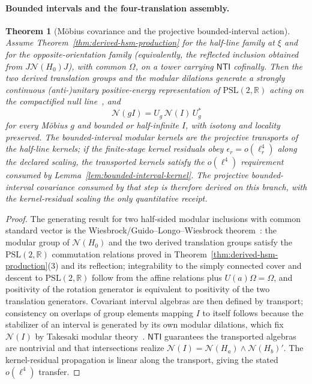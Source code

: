 \documentclass[11pt]{article}
\newtheorem{theorem}{Theorem}[section]
\begin{document}
\paragraph{Bounded intervals and the four-translation assembly.}

\begin{theorem}[M\"obius covariance and the projective bounded-interval action]
\label{thm:mobius-bounded-intervals}
Assume Theorem~\ref{thm:derived-hsm-production} for the half-line family at
\(\xi\) and for the opposite-orientation family (equivalently, the reflected
inclusion obtained from \(J\mathcal N(H_0)J\)), with common \(\Omega\), on a
tower carrying \(\mathsf{NTI}\) cofinally. Then the two derived translation
groups and the modular dilations generate a strongly continuous (anti-)unitary
positive-energy representation of \(\mathrm{PSL}(2,\mathbb R)\) acting on the
compactified null line~\cite{wiesbrock93,glw98}, and
\[
\mathcal N(gI)=U_g\,\mathcal N(I)\,U_g^{*}
\]
for every M\"obius \(g\) and bounded or half-infinite \(I\), with isotony and
locality preserved. The bounded-interval modular kernels are the projective
transports of the half-line kernels; if the finite-stage kernel residuals obey
\(\epsilon_r=o(\ell_r^4)\) along the declared scaling, the transported kernels
satisfy the \(o(\ell^4)\) requirement consumed by
Lemma~\ref{lem:bounded-interval-kernel}. The projective bounded-interval
covariance consumed by that step is therefore derived on this branch, with the
kernel-residual scaling the only quantitative receipt.
\end{theorem}

\begin{proof}
The generating result for two half-sided modular inclusions with common
standard vector is the Wiesbrock/Guido--Longo--Wiesbrock
theorem~\cite{wiesbrock93,glw98}: the modular group of
\(\mathcal N(H_0)\) and the two derived translation groups satisfy the
\(\mathrm{PSL}(2,\mathbb R)\) commutation relations proved in
Theorem~\ref{thm:derived-hsm-production}(3) and its reflection; integrability
to the simply connected cover and descent to \(\mathrm{PSL}(2,\mathbb R)\)
follow from the affine relations plus \(U(a)\Omega=\Omega\), and positivity of
the rotation generator is equivalent to positivity of the two translation
generators. Covariant interval algebras are then defined by transport;
consistency on overlaps of group elements mapping \(I\) to itself follows
because the stabilizer of an interval is generated by its own modular
dilations, which fix \(\mathcal N(I)\) by Takesaki modular
theory~\cite{takesaki72}. \(\mathsf{NTI}\) guarantees the transported algebras
are nontrivial and that intersections realize
\(\mathcal N(I)=\mathcal N(H_a)\wedge\mathcal N(H_b)'\). The kernel-residual
propagation is linear along the transport, giving the stated \(o(\ell^4)\)
transfer.
\end{proof}
\end{document}

